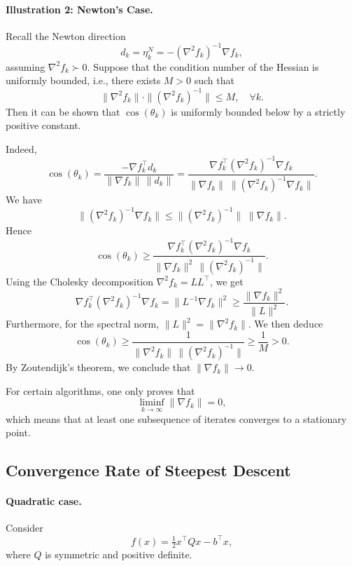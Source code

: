 \paragraph{Illustration 2: Newton's Case.}

Recall the Newton direction
\[
    d_k = \eta_k^N = -(\nabla^2 f_k)^{-1}\nabla f_k,
\]
assuming $\nabla^2 f_k \succ 0$. Suppose that the condition number of the
Hessian is uniformly bounded, i.e., there exists $M>0$ such that
\[
    \|\nabla^2 f_k\|\cdot\|(\nabla^2 f_k)^{-1}\| \le M, \quad \forall k.
\]
Then it can be shown that $\cos(\theta_k)$ is uniformly bounded below
by a strictly positive constant.

Indeed,
\[
    \cos(\theta_k)
    = \frac{-\nabla f_k^\top d_k}{\|\nabla f_k\|\,\|d_k\|}
    = \frac{\nabla f_k^\top (\nabla^2 f_k)^{-1} \nabla f_k}
           {\|\nabla f_k\|\;\|(\nabla^2 f_k)^{-1}\nabla f_k\|}.
\]
We have
\[
    \|(\nabla^2 f_k)^{-1}\nabla f_k\|
    \le \|(\nabla^2 f_k)^{-1}\|\;\|\nabla f_k\|.
\]
Hence
\[
    \cos(\theta_k)
    \ge \frac{\nabla f_k^\top (\nabla^2 f_k)^{-1} \nabla f_k}
              {\|\nabla f_k\|^2 \,\|(\nabla^2 f_k)^{-1}\|}.
\]
Using the Cholesky decomposition $\nabla^2 f_k = LL^\top$,
we get
\[
    \nabla f_k^\top (\nabla^2 f_k)^{-1} \nabla f_k
    = \|L^{-1}\nabla f_k\|^2
    \ge \frac{\|\nabla f_k\|^2}{\|L\|^2}.
\]
Furthermore, for the spectral norm, $\|L\|^2 = \|\nabla^2 f_k\|$.
We then deduce
\[
    \cos(\theta_k)
    \ge \frac{1}{\|\nabla^2 f_k\|\,\|(\nabla^2 f_k)^{-1}\|}
    \ge \frac{1}{M} > 0.
\]
By Zoutendijk's theorem, we conclude that $\|\nabla f_k\| \to 0$.

\begin{remarque}
For certain algorithms, one only proves that
\[
    \liminf_{k\to\infty} \|\nabla f_k\| = 0,
\]
which means that at least one subsequence of iterates converges to a
stationary point.
\end{remarque}

\subsection{Convergence Rate of Steepest Descent}
\label{subsec:2.4.4}

\paragraph{Quadratic case.}

Consider
\[
    f(x) = \tfrac{1}{2} x^\top Q x - b^\top x,
\]
where $Q$ is symmetric and positive definite.

